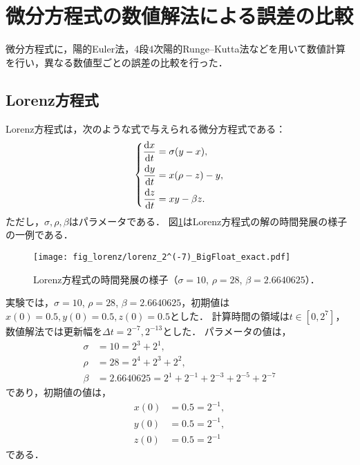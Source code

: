 \section{微分方程式の数値解法による誤差の比較}
微分方程式に，陽的Euler法，4段4次陽的Runge--Kutta法などを用いて数値計算を行い，異なる数値型ごとの誤差の比較を行った．
\subsection{Lorenz方程式}
Lorenz方程式は，次のような式で与えられる微分方程式である：
\begin{align*}
    \left\{
        \begin{aligned}
            \frac{\mathrm{d}x}{\mathrm{d}t} &= \sigma(y-x), \\
            \frac{\mathrm{d}y}{\mathrm{d}t} &= x(\rho-z)-y, \\
            \frac{\mathrm{d}z}{\mathrm{d}t} &= xy - \beta z.
        \end{aligned}   
    \right.
\end{align*}
ただし，$\sigma,\rho,\beta$はパラメータである．
図\ref{fig:lorenz}はLorenz方程式の解の時間発展の様子の一例である．
\begin{figure}[H]
    \centering
    \texttt{[image: fig\_lorenz/lorenz\_2^(-7)\_BigFloat\_exact.pdf]}
    \caption{Lorenz方程式の時間発展の様子（$\sigma=10$, $\rho=28$, $\beta=2.6640625$）．}
    \label{fig:lorenz}
\end{figure}
実験では，$\sigma=10$, $\rho=28$, $\beta=2.6640625$，初期値は$x(0) = 0.5, y(0) = 0.5, z(0) = 0.5$とした．
計算時間の領域は$t \in [0,2^7]$，数値解法では更新幅を$\Delta t =  2^{-7}, 2^{-13}$とした．
パラメータの値は，
\begin{align*}
    \sigma &= 10 = 2^3 + 2^1, \\
    \rho &= 28 = 2^4 + 2^3 + 2^2, \\
    \beta &= 2.6640625 = 2^1 + 2^{-1} + 2^{-3} + 2^{-5} + 2^{-7}
\end{align*}
であり，初期値の値は，
\begin{align*}
    x(0) &= 0.5 = 2^{-1}, \\
    y(0) &= 0.5 = 2^{-1}, \\
    z(0) &= 0.5 = 2^{-1}
\end{align*}
である．
